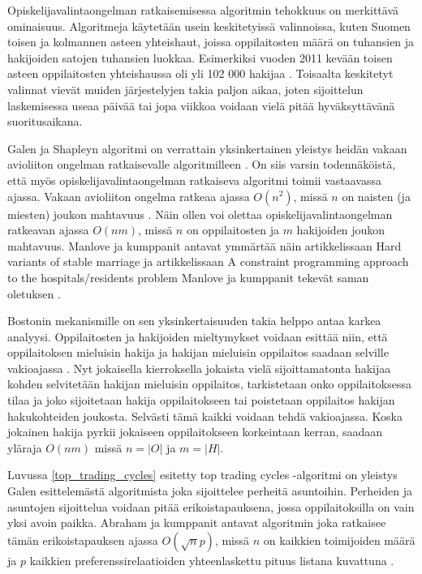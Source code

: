 \documentclass[twoside]{tktltiki}
\begin{document}
Opiskelijavalintaongelman ratkaisemisessa algoritmin tehokkuus on
merkittävä ominaisuus. Algoritmeja käytetään usein keskitetyissä
valinnoissa, kuten Suomen toisen ja kolmannen asteen yhteishaut,
joissa oppilaitosten määrä on tuhansien ja hakijoiden satojen
tuhansien luokkaa. Esimerkiksi vuoden 2011 kevään toisen asteen
oppilaitosten yhteishaussa oli yli 102 000 hakijaa \cite{OPH12}.
Toisaalta keskitetyt valinnat vievät muiden järjestelyjen takia paljon
aikaa, joten sijoittelun laskemisessa useaa päivää tai jopa viikkoa
voidaan vielä pitää hyväksyttävänä suoritusaikana.

Galen ja Shapleyn algoritmi on verrattain yksinkertainen yleistys
heidän vakaan avioliiton ongelman ratkaisevalle algoritmilleen
\cite{gusfield89}. On siis varsin todennäköistä, että myös
opiskelijavalintaongelman ratkaiseva algoritmi toimii vastaavassa
ajassa. Vakaan avioliiton ongelma ratkeaa ajassa $O(n^2)$, missä $n$
on naisten (ja miesten) joukon mahtavuus \cite{gusfield89}. Näin ollen
voi olettaa opiskelijavalintaongelman ratkeavan ajassa $O(nm)$, missä
$n$ on oppilaitosten ja $m$ hakijoiden joukon mahtavuus. Manlove ja
kumppanit antavat ymmärtää näin artikkelissaan Hard variants of stable
marriage \cite{manlove02} ja artikkelissaan A constraint programming
approach to the hospitals/residents problem Manlove ja kumppanit
tekevät saman oletuksen \cite{manlove07}.

Bostonin mekanismille on sen yksinkertaisuuden takia helppo antaa
karkea analyysi. Oppilaitosten ja hakijoiden mieltymykset voidaan
esittää niin, että oppilaitoksen mieluisin hakija ja hakijan mieluisin
oppilaitos saadaan selville vakioajassa \cite{gusfield89}. Nyt
jokaisella kierroksella jokaista vielä sijoittamatonta hakijaa kohden
selvitetään hakijan mieluisin oppilaitos, tarkistetaan onko
oppilaitoksessa tilaa ja joko sijoitetaan hakija oppilaitokseen tai
poistetaan oppilaitos hakijan hakukohteiden joukosta. Selvästi tämä
kaikki voidaan tehdä vakioajassa. Koska jokainen hakija pyrkii
jokaiseen oppilaitokseen korkeintaan kerran, saadaan yläraja $O(nm)$
missä $n = |O|$ ja $m = |H|$.

Luvussa \ref{top_trading_cycles} esitetty top trading cycles
-algoritmi on yleistys Galen esittelemästä algoritmista joka
sijoittelee perheitä asuntoihin. Perheiden ja asuntojen sijoittelua
voidaan pitää erikoistapauksena, jossa oppilaitoksilla on vain yksi
avoin paikka. Abraham ja kumppanit antavat algoritmin joka ratkaisee
tämän erikoistapauksen ajassa $O(\sqrt np)$, missä $n$ on kaikkien
toimijoiden määrä ja $p$ kaikkien preferenssirelaatioiden
yhteenlaskettu pituus listana kuvattuna \cite{abraham05}.
\end{document}

